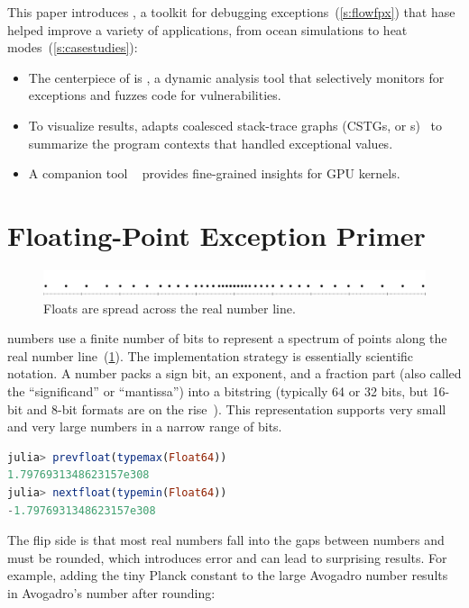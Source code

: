\documentclass{juliacon}
\begin{document}
This paper introduces \FlowFPX{}, a toolkit for debugging
\fp{} exceptions~(\cref{s:flowfpx})
that hase helped improve a variety of applications,
from ocean simulations to heat modes~(\cref{s:casestudies}):
\begin{itemize}
  \item
    The centerpiece of \FlowFPX{} is \FT{}, a dynamic analysis tool that
    selectively monitors for exceptions and fuzzes code for vulnerabilities.
  \item
    To visualize results, \FT{} adapts coalesced stack-trace graphs (CSTGs, or
    \CSTG{}s)~\cite{humphreySystematicDebuggingMethods2014}
    to summarize the program contexts that handled exceptional values.
  \item
    A companion tool \GPUFPX{}~\cite{llsflg-hpdc-2023} provides fine-grained insights for GPU kernels.
\end{itemize}


\section{Floating-Point Exception Primer}
\label{s:background}

\begin{figure}[t]\centering
  \includegraphics[trim=0 0 0 60,clip,width=0.95\columnwidth]{fig/real_vs_fp.png}
  \caption{Floats are spread across the real number line.}
  \label{f:real-vs-fp}
\end{figure}

\Fp{} numbers use a finite number of bits to represent a spectrum of points along the real number line~(\cref{f:real-vs-fp}).
The implementation strategy is essentially scientific notation.
A \fp{} number packs a sign bit, an exponent, and a fraction part (also called the ``significand'' or ``mantissa'') into a bitstring (typically 64 or 32 bits, but 16-bit and 8-bit formats are on the rise~\cite{klowerLowprecisionClimateComputing2021,fp8}).
This representation supports very small and very large numbers in a narrow range of bits.

\begin{lstlisting}[language = Julia]
julia> prevfloat(typemax(Float64))
1.7976931348623157e308
julia> nextfloat(typemin(Float64))
-1.7976931348623157e308
\end{lstlisting}

The flip side is that most real numbers fall into the gaps between \fp{} numbers and must be rounded, which introduces error
and can lead to surprising results.
For example, adding the tiny Planck constant to the large Avogadro number results
in Avogadro's number after rounding:
\end{document}
